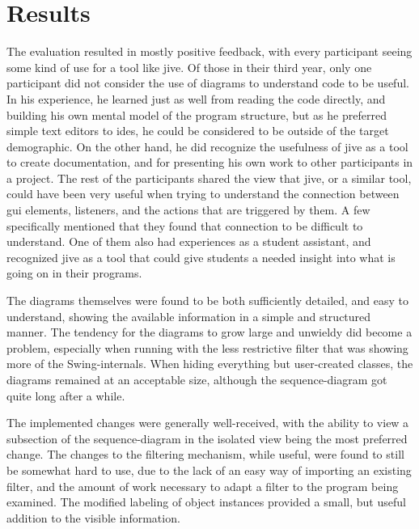 \section{Results}\label{jiveEvalResults}
The evaluation resulted in mostly positive feedback, with every participant seeing some kind of use for a tool like \gls{jive}.
Of those in their third year, only one participant did not consider the use of diagrams to understand code to be useful.
In his experience, he learned just as well from reading the code directly, and building his own mental model of the program structure, but as he preferred simple text editors to \gls{ide}s, he could be considered to be outside of the target demographic.
On the other hand, he did recognize the usefulness of \gls{jive} as a tool to create documentation, and for presenting his own work to other participants in a project.
The rest of the participants shared the view that \gls{jive}, or a similar tool, could have been very useful when trying to understand the connection between \gls{gui} elements, listeners, and the actions that are triggered by them.
A few specifically mentioned that they found that connection to be difficult to understand.
One of them also had experiences as a student assistant, and recognized \gls{jive} as a tool that could give students a needed insight into what is going on in their programs.

The diagrams themselves were found to be both sufficiently detailed, and easy to understand, showing the available information in a simple and structured manner.
The tendency for the diagrams to grow large and unwieldy did become a problem, especially when running with the less restrictive filter that was showing more of the Swing-internals.
When hiding everything but user-created classes, the diagrams remained at an acceptable size, although the sequence-diagram got quite long after a while.

The implemented changes were generally well-received, with the ability to view a subsection of the sequence-diagram in the isolated view being the most preferred change.
The changes to the filtering mechanism, while useful, were found to still be somewhat hard to use, due to the lack of an easy way of importing an existing filter, and the amount of work necessary to adapt a filter to the program being examined.
The modified labeling of object instances provided a small, but useful addition to the visible information.

